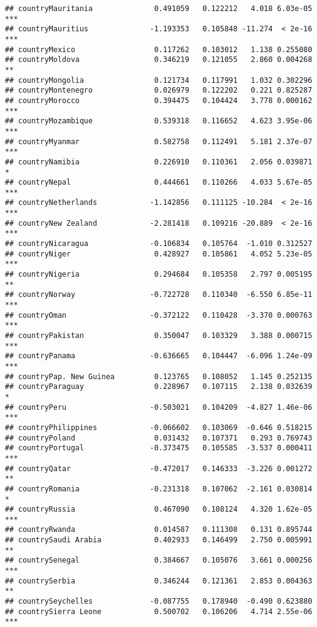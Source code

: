 \documentclass[
  11pt,
]{article}
\begin{document}
\begin{verbatim}
## countryMauritania              0.491059   0.122212   4.018 6.03e-05 ***
## countryMauritius              -1.193353   0.105848 -11.274  < 2e-16 ***
## countryMexico                  0.117262   0.103012   1.138 0.255080    
## countryMoldova                 0.346219   0.121055   2.860 0.004268 ** 
## countryMongolia                0.121734   0.117991   1.032 0.302296    
## countryMontenegro              0.026979   0.122202   0.221 0.825287    
## countryMorocco                 0.394475   0.104424   3.778 0.000162 ***
## countryMozambique              0.539318   0.116652   4.623 3.95e-06 ***
## countryMyanmar                 0.582758   0.112491   5.181 2.37e-07 ***
## countryNamibia                 0.226910   0.110361   2.056 0.039871 *  
## countryNepal                   0.444661   0.110266   4.033 5.67e-05 ***
## countryNetherlands            -1.142856   0.111125 -10.284  < 2e-16 ***
## countryNew Zealand            -2.281418   0.109216 -20.889  < 2e-16 ***
## countryNicaragua              -0.106834   0.105764  -1.010 0.312527    
## countryNiger                   0.428927   0.105861   4.052 5.23e-05 ***
## countryNigeria                 0.294684   0.105358   2.797 0.005195 ** 
## countryNorway                 -0.722728   0.110340  -6.550 6.85e-11 ***
## countryOman                   -0.372122   0.110428  -3.370 0.000763 ***
## countryPakistan                0.350047   0.103329   3.388 0.000715 ***
## countryPanama                 -0.636665   0.104447  -6.096 1.24e-09 ***
## countryPap. New Guinea         0.123765   0.108052   1.145 0.252135    
## countryParaguay                0.228967   0.107115   2.138 0.032639 *  
## countryPeru                   -0.503021   0.104209  -4.827 1.46e-06 ***
## countryPhilippines            -0.066602   0.103069  -0.646 0.518215    
## countryPoland                  0.031432   0.107371   0.293 0.769743    
## countryPortugal               -0.373475   0.105585  -3.537 0.000411 ***
## countryQatar                  -0.472017   0.146333  -3.226 0.001272 ** 
## countryRomania                -0.231318   0.107062  -2.161 0.030814 *  
## countryRussia                  0.467090   0.108124   4.320 1.62e-05 ***
## countryRwanda                  0.014587   0.111308   0.131 0.895744    
## countrySaudi Arabia            0.402933   0.146499   2.750 0.005991 ** 
## countrySenegal                 0.384667   0.105076   3.661 0.000256 ***
## countrySerbia                  0.346244   0.121361   2.853 0.004363 ** 
## countrySeychelles             -0.087755   0.178940  -0.490 0.623880    
## countrySierra Leone            0.500702   0.106206   4.714 2.55e-06 ***

\end{verbatim}
\end{document}
